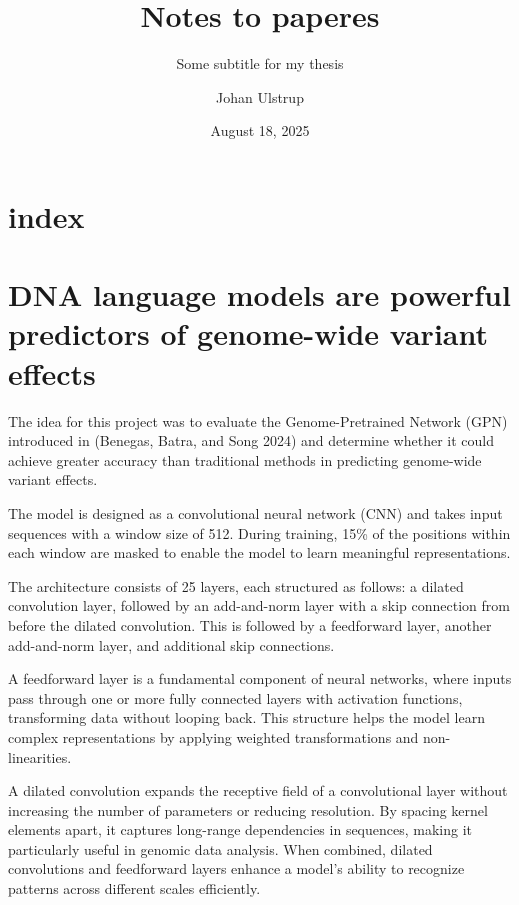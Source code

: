 \documentclass[
  a4paper,
  openany]{scrbook}
\title{Notes to paperes}
\subtitle{Some subtitle for my thesis}
\author{Johan Ulstrup}
\date{August 18, 2025}
\renewcommand*\contentsname{Table of contents}
\newcommand\contentsname{Table of contents}
\begin{document}
\frontmatter
\maketitle

\renewcommand*\contentsname{Table of contents}
{
\setcounter{tocdepth}{1}
\tableofcontents
}

\mainmatter
\chapter{index}\label{index}

\chapter{DNA language models are powerful predictors of genome-wide
variant
effects}\label{dna-language-models-are-powerful-predictors-of-genome-wide-variant-effects}

The idea for this project was to evaluate the Genome-Pretrained Network
(GPN) introduced in (Benegas, Batra, and Song 2024) and determine
whether it could achieve greater accuracy than traditional methods in
predicting genome-wide variant effects.

The model is designed as a convolutional neural network (CNN) and takes
input sequences with a window size of 512. During training, 15\% of the
positions within each window are masked to enable the model to learn
meaningful representations.

The architecture consists of 25 layers, each structured as follows: a
dilated convolution layer, followed by an add-and-norm layer with a skip
connection from before the dilated convolution. This is followed by a
feedforward layer, another add-and-norm layer, and additional skip
connections.

A feedforward layer is a fundamental component of neural networks, where
inputs pass through one or more fully connected layers with activation
functions, transforming data without looping back. This structure helps
the model learn complex representations by applying weighted
transformations and non-linearities.

A dilated convolution expands the receptive field of a convolutional
layer without increasing the number of parameters or reducing
resolution. By spacing kernel elements apart, it captures long-range
dependencies in sequences, making it particularly useful in genomic data
analysis. When combined, dilated convolutions and feedforward layers
enhance a model's ability to recognize patterns across different scales
efficiently.
\end{document}
